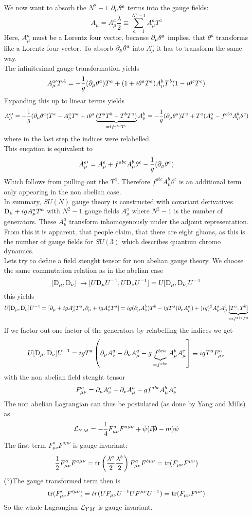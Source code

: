 We now want to absorb the $N^2-1$ $\partial_\mu \theta^a$ terms into the gauge fields:
\[ A_\mu = A_\mu ^a \frac{\lambda}{2} \equiv \sum_{a = 1}^{N^2 -1} A_\mu^a T^a\]
Here, $A_\mu^a$ must be a Lorentz four vector, because $\partial_\mu \theta^a$ implies, that $\theta^a$ transforms like a Lorentz four vector. To absorb $\partial_\mu \theta^a$ into $A_\mu^a$ it has to transform the same way.\\
The infinitesimal gauge transformation yields
\[ A_\mu^{a\prime} T^A = - \frac{1}{g} ( \partial_\mu \theta^a) T^a + ( 1 + i \theta^a T^a) A_\mu^b T^b ( 1-i \theta^c T^c)\]
Expanding this up to linear terms yields
\[ A_\mu^{a\prime} = - \frac{1}{g} ( \partial_\mu \theta^a) T^a - A_\mu^a T^a + i \theta^a\underbrace{( T^a T^b - T^b T^a)}_{= i f^{abc}T^c} A_\mu^b = -\frac{1}{g} (\partial_\mu \theta^a)T^a + T^a( A_\mu^a - f^{cba} A_\mu^b \theta^c)\]
where in the last step the indices were relabelled.\\
This euqation is equivalent to
\[ A_\mu^{a\prime} = A_\mu^a + f^{abc} A_\mu^b \theta^c - \frac{1}{g}(\partial_\mu \theta^a)\]
Which follows from pulling out the $T^a$. Therefore $f^{abc}A_\mu^b \theta^c$ is an additional term only appearing in the non abelian case.\\
In summary, $SU(N)$ gauge theory is constructed with covariant derivatives ${\rm D}_\mu + igA_\mu^a T^a$ with $N^2-1$ gauge fields $A_\mu^a$ where $N^2-1$ is the number of generators. These $A_\mu^a$ transform inhomogenously under the adjoint representation. From this it is apparent, that people claim, that there are eight gluons, as this is the number of gauge fields for $SU(3)$ which describes quantum chromo dynamics.\\
Lets try to define a field stenght tensor for non abelian gauge theory. We choose the same commutation relation as in the abelian case
\[ [{\rm D}_\mu, {\rm D}_\nu] ~\rightarrow [ U {\rm D}_\mu U^{-1}, U{\rm D}_\nu U^{-1}] = U [ {\rm D}_\mu, {\rm D}_\nu]U^{-1}\]
this yields
\[ U [ {\rm D}_\mu, {\rm D}_\nu]U^{-1} = [ \partial_\mu + i g A_\mu^a T^a, \partial_\mu + i gA_\nu^aT^a] = ig ( \partial_\mu A_\nu^b)T^b - igT^a(\partial_\nu A_\mu^a) + (ig)^2 A_\mu ^a A_\mu^b \underbrace{[T^a, T^b]}_{= i f^{abc} T^c}\]
If we factor out one factor of the generators by relabelling the indices we get
\[ U [ {\rm D}_\mu, {\rm D}_\nu]U^{-1} = i gT^a \left( \partial_\mu A_\nu^a - \partial_\nu A_\mu^a - g \underbrace{f^{bca}}_{= f^{abc}}A_\mu^b A_\mu^c\right] \equiv i g T^a F^a_{\mu\nu}\]
with the non abelian field stenght tensor
\[ F^a_{\mu\nu} = \partial_\mu A^a_\nu - \partial_\nu A_\mu^a - gf^{abc} A_\mu^b A_\nu^c\]
The non abelian Lagrangian can thus be postulated (as done by Yang and Mills) as
\[ \LL_{YM} = - \frac{1}{4} F_{\mu\nu}^a F^{a\mu\nu} + \bar{\psi}(i \slashed{\Dd} - m ) \psi\]
The first term $F^a_{\mu\nu}F^{a\mu\nu}$ is gauge invariant:
\[ \frac{1}{2} F_{\mu\nu}^a F^{a\mu\nu} = {\rm tr}\left( \frac{\lambda^a}{2}\frac{\lambda^b}{2}\right) F_{\mu\nu}^aF^{b\mu\nu} = {\rm tr}( F_{\mu\nu}F^{\mu\nu})\]
(?)The gauge transformed term then is
\[{\rm tr}(F_{\mu\nu}'F^{\prime\mu\nu}) = tr( U F_{\mu\nu}U^{-1}UF^{\mu\nu}U^{-1}) = {\rm tr}(F_{\mu\nu}F^{\mu\nu})\]
So the whole Lagrangian $\mathcal{L}_{YM}$ is gauge invariant. 
